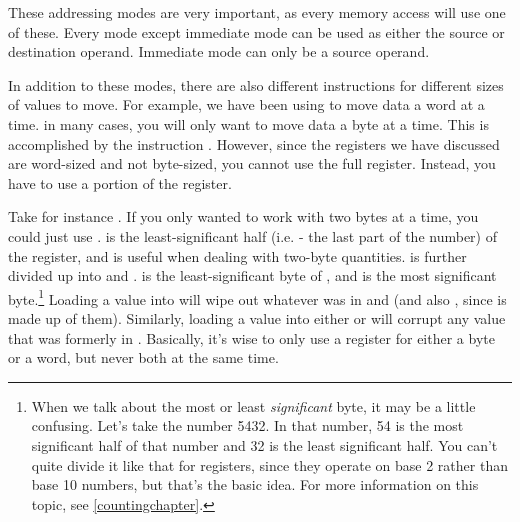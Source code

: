 These addressing modes are very important, as every memory access will use
one of these.  Every mode except immediate mode can be used as either the
source or destination operand.  Immediate mode can only be a source operand.

In addition to these modes, there are also different instructions for different
sizes of values to move.  For example, we have been using 
 to move data a word at a time.  in many cases, you
will only want to move data a byte at a time.  This is accomplished by the
instruction .  However, since the registers we have
discussed are word-sized and not byte-sized, you cannot use the full register.
Instead, you have to use a portion of the register.

Take for instance {\eaxReg}.  If you only wanted to work with two bytes at a time,
you could just use {\axRegIdx}.  {\axReg} is the least-significant half (i.e. - the last part of the number) of the {\eaxReg} 
register, and is useful when dealing with two-byte quantities.  {\axReg} is
further divided up into {\alRegIdx} and {\ahRegIdx}.  {\alReg} is the least-significant byte of
{\axReg}, and {\ahReg} is the most significant byte.\footnote{When we talk about
the most or least \emph{significant} byte, it may be a little confusing.  
Let's take the number 5432.  In that number, 54 is the most significant half
of that number and 32 is the least significant half.  You can't quite divide
it like that for registers, since they operate on base 2 rather than base 10
numbers, but that's the basic idea.  For more information on this topic, see
\autoref{countingchapter}.}  Loading a value into
{\eaxReg} will wipe out whatever was in {\alReg} and {\ahReg} (and also {\axReg}, since {\axReg}
is made up of them).  Similarly, loading a value into either {\alReg} or {\ahReg}
will corrupt any value that was formerly in {\eaxReg}.  Basically, it's wise
to only use a register for either a byte or a word, but never both at the
same time.

